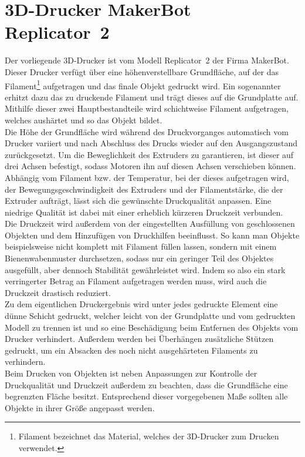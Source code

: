 \section{3D-Drucker MakerBot Replicator\texttrademark\ 2}
Der vorliegende 3D-Drucker ist vom Modell Replicator\texttrademark\ 2 der Firma MakerBot.
Dieser Drucker verfügt über eine höhenverstellbare Grundfläche, auf der das Filament\footnote{Filament bezeichnet das Material, welches der 3D-Drucker zum Drucken verwendet.} aufgetragen und das finale Objekt gedruckt wird.
Ein sogenannter  erhitzt dazu das zu druckende Filament und trägt dieses auf die Grundplatte auf. 
Mithilfe dieser zwei Hauptbestandteile wird schichtweise Filament aufgetragen, welches aushärtet und so das Objekt bildet. \\
Die Höhe der Grundfläche wird während des Druckvorganges automatisch vom Drucker variiert und nach Abschluss des Drucks wieder auf den Ausgangszustand zurückgesetzt.
Um die Beweglichkeit des Extruders zu garantieren, ist dieser auf drei Achsen befestigt, sodass Motoren ihn auf diesen Achsen verschieben können. \\
Abhängig vom Filament bzw. der Temperatur, bei der dieses aufgetragen wird, der Bewegungsgeschwindigkeit des Extruders und der Filamentstärke, die der Extruder aufträgt, lässt sich die gewünschte Druckqualität anpassen.
Eine niedrige Qualität ist dabei mit einer erheblich kürzeren Druckzeit verbunden. \\
Die Druckzeit wird außerdem von der eingestellten Ausfüllung von geschlossenen Objekten und dem Hinzufügen von Druckhilfen beeinflusst.
So kann man Objekte beispielsweise nicht komplett mit Filament füllen lassen, sondern mit einem Bienenwabenmuster durchsetzen, sodass nur ein geringer Teil des Objektes ausgefüllt, aber dennoch Stabilität gewährleistet wird.
Indem so also ein stark verringerter Betrag an Filament aufgetragen werden muss, wird auch die Druckzeit drastisch reduziert. \\
Zu dem eigentlichen Druckergebnis wird unter jedes gedruckte Element eine dünne Schicht gedruckt, welcher leicht von der Grundplatte und vom gedruckten Modell zu trennen ist und so eine Beschädigung beim Entfernen des Objekts vom Drucker verhindert.
Außerdem werden bei Überhängen zusätzliche Stützen gedruckt, um ein Absacken des noch nicht ausgehärteten Filaments zu verhindern.  \\
Beim Drucken von Objekten ist neben Anpassungen zur Kontrolle der Druckqualität und Druckzeit außerdem zu beachten, dass die Grundfläche eine begrenzten Fläche besitzt.
Entsprechend dieser vorgegebenen Maße sollten alle Objekte in ihrer Größe angepasst werden.
